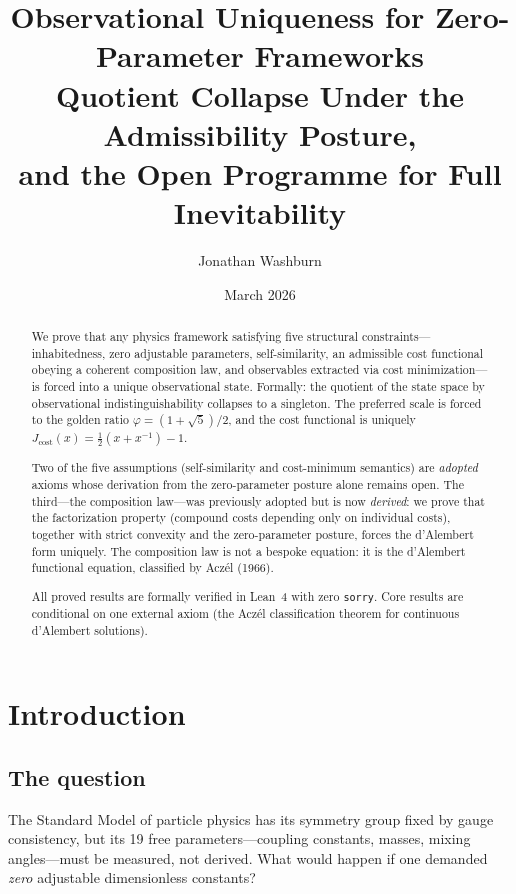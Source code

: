 \documentclass[11pt]{article}
\title{Observational Uniqueness for Zero-Parameter Frameworks\\[4pt]
\large Quotient Collapse Under the Admissibility Posture,\\
and the Open Programme for Full Inevitability}
\author{Jonathan Washburn}
\date{March 2026}
\newcommand{\Jcost}{J_{\mathrm{cost}}}
\theoremstyle{definition}
\theoremstyle{remark}
\begin{document}
\maketitle

\begin{abstract}
We prove that any physics framework satisfying five structural
constraints---inhabitedness, zero adjustable parameters, self-similarity,
an admissible cost functional obeying a coherent composition law, and
observables extracted via cost minimization---is forced into a unique
observational state.
Formally: the quotient of the state space by observational
indistinguishability collapses to a singleton.
The preferred scale is forced to the golden ratio
$\varphi = (1+\sqrt{5})/2$, and the cost functional is uniquely
$\Jcost(x) = \tfrac{1}{2}(x + x^{-1}) - 1$.

Two of the five assumptions (self-similarity and cost-minimum semantics)
are \emph{adopted} axioms whose derivation from the zero-parameter
posture alone remains open.
The third---the composition law---was previously adopted but is now
\emph{derived}: we prove that the factorization property (compound costs
depending only on individual costs), together with strict convexity and
the zero-parameter posture, forces the d'Alembert form uniquely.
The composition law is not a bespoke equation: it is the d'Alembert
functional equation, classified by Acz\'el (1966).

All proved results are formally verified in Lean~4 with zero
\texttt{sorry}.
Core results are conditional on one external axiom (the Acz\'el
classification theorem for continuous d'Alembert solutions).
\end{abstract}

\tableofcontents
\newpage

\section{Introduction}\label{sec:intro}

\subsection{The question}

The Standard Model of particle physics has its symmetry group
fixed by gauge consistency, but its 19 free parameters---coupling
constants, masses, mixing angles---must be measured, not derived.
What would happen if one demanded \emph{zero} adjustable
dimensionless constants?
\end{document}

